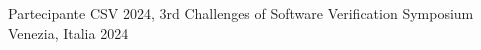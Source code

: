 
\begin{cvhonors}

  \cvhonor
	{Partecipante}
	{CSV 2024, 3rd Challenges of Software Verification Symposium}
	{Venezia, Italia} %
	{2024} %

\end{cvhonors}
